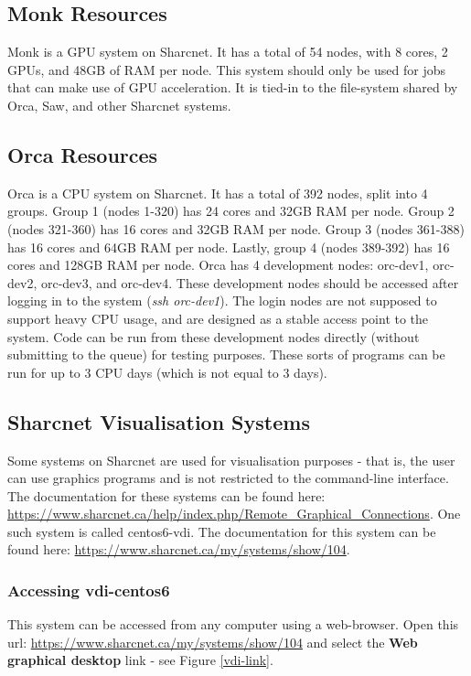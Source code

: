 \documentclass[12pt]{article}
\begin{document}
\subsection{Monk Resources}
\quad Monk is a GPU system on Sharcnet. It has a total of 54 nodes, with 8 cores, 2 GPUs, and 48GB of RAM per node. This system should only be used for jobs that can make use of GPU acceleration. It is tied-in to the file-system shared by Orca, Saw, and other Sharcnet systems.

\subsection{Orca Resources}

\quad Orca is a CPU system on Sharcnet. It has a total of 392 nodes, split into 4 groups. Group 1 (nodes 1-320) has 24 cores and 32GB RAM per node. Group 2 (nodes 321-360) has 16 cores and 32GB RAM per node. Group 3 (nodes 361-388) has 16 cores and 64GB RAM per node. Lastly, group 4 (nodes 389-392) has 16 cores and 128GB RAM per node. Orca has 4 development nodes: orc-dev1, orc-dev2, orc-dev3, and orc-dev4. These development nodes should be accessed after logging in to the system (\textit{ssh orc-dev1}). The login nodes are not supposed to support heavy CPU usage, and are designed as a stable access point to the system. Code can be run from these development nodes directly (without submitting to the queue) for testing purposes. These sorts of programs can be run for up to 3 CPU days (which is not equal to 3 days). 

\subsection{Sharcnet Visualisation Systems}\label{visual}

\quad Some systems on Sharcnet are used for visualisation purposes - that is, the user can use graphics programs and is not restricted to the command-line interface. The documentation for these systems can be found here: \url{https://www.sharcnet.ca/help/index.php/Remote_Graphical_Connections}. One such system is called centos6-vdi. The documentation for this system can be found here: \url{https://www.sharcnet.ca/my/systems/show/104}. 

\subsubsection{Accessing vdi-centos6}

\quad This system can be accessed from any computer using a web-browser. Open this url: \url{https://www.sharcnet.ca/my/systems/show/104} and select the \textbf{Web graphical desktop} link - see Figure \ref{vdi-link}.
\end{document}
